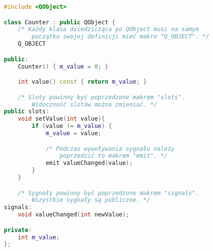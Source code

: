 \begin{lstlisting}[language=C++]
#include <QObject>

class Counter : public QObject {
    /* Każdy klasa dziedzicząca po QObject musi na samym
        początku swojej definicji mieć makro "Q_OBJECT". */
    Q_OBJECT

public:
    Counter() { m_value = 0; }

    int value() const { return m_value; }

    /* Sloty powinny być poprzedzone makrem "slots".
        Widoczność slotów można zmieniać. */
public slots:
    void setValue(int value){
        if (value != m_value) {
            m_value = value;

            /* Podczas wywoływania sygnału należy
                poprzedzić to makrem "emit". */
            emit valueChanged(value);
        }
    }

    /* Sygnały powinny być poprzedzone makrem "signals".
        Wszystkie sygnały są publiczne. */
signals:
    void valueChanged(int newValue);

private:
    int m_value;
};

\end{lstlisting}